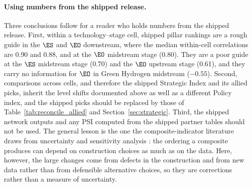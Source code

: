 \paragraph{Using numbers from the shipped release.} Three conclusions follow for a reader who
holds numbers from the shipped release. First, within a technology--stage cell, shipped pillar
rankings are a rough guide in the $\ES$ and $\EO$ downstream, where the median within-cell
correlations are 0.90 and 0.88, and at the $\EO$ midstream stage (0.80). They are a poor guide at
the $\ES$ midstream stage (0.70) and the $\EO$ upstream stage (0.61), and they carry no
information for $\EO$ in Green Hydrogen midstream ($-0.55$). Second, comparisons across cells,
and therefore the shipped Strategic Index and its allied picks, inherit the level shifts
documented above as well as a different Policy index, and the shipped picks should be replaced by
those of Table~\ref{tab:reconcile_allied} and Section~\ref{sec:strategic}. Third, the shipped
network outputs and any PSI computed from the shipped partner tables should not be used. The
general lesson is the one the composite-indicator literature draws from uncertainty and
sensitivity analysis \citep{saisana2005uncertainty,saltelli2007composite}: the ordering a
composite produces can depend on construction choices as much as on the data. Here, however, the
large changes come from defects in the construction and from new data rather than from
defensible alternative choices, so they are corrections rather than a measure of uncertainty.
